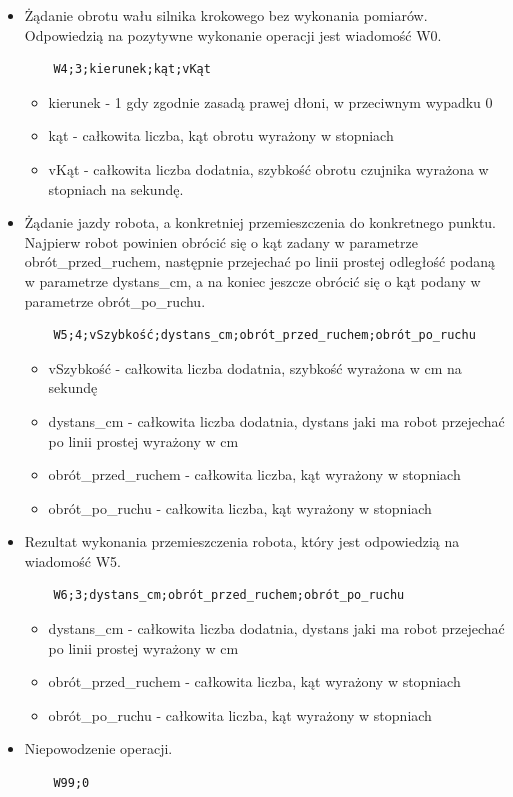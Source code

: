 \documentclass[a4paper]{article}
\begin{document}
\begin{itemize}
\begin{itemize}
	\end{itemize}
\item Żądanie obrotu wału silnika krokowego bez wykonania pomiarów. Odpowiedzią na pozytywne wykonanie operacji jest wiadomość W0.
\begin{verbatim}
	W4;3;kierunek;kąt;vKąt
\end{verbatim}
	\begin{itemize}
	\item kierunek - 1 gdy zgodnie zasadą prawej dłoni, w przeciwnym wypadku 0
	\item kąt - całkowita liczba, kąt obrotu wyrażony w stopniach
	\item vKąt - całkowita liczba dodatnia, szybkość obrotu czujnika wyrażona w stopniach na sekundę.
	\end{itemize}
\item Żądanie jazdy robota, a konkretniej przemieszczenia do konkretnego punktu. Najpierw robot powinien obrócić się o kąt zadany w parametrze obrót\_przed\_ruchem, następnie przejechać po linii prostej odległość podaną w parametrze dystans\_cm, a na koniec jeszcze obrócić się o kąt podany w parametrze obrót\_po\_ruchu. 
\begin{verbatim}
	W5;4;vSzybkość;dystans_cm;obrót_przed_ruchem;obrót_po_ruchu
\end{verbatim}
	\begin{itemize}
	\item vSzybkość - całkowita liczba dodatnia, szybkość wyrażona w cm na sekundę
	\item dystans\_cm - całkowita liczba dodatnia, dystans jaki ma robot przejechać po linii prostej wyrażony w cm
	\item obrót\_przed\_ruchem - całkowita liczba, kąt wyrażony w stopniach
	\item obrót\_po\_ruchu - całkowita liczba, kąt wyrażony w stopniach
	\end{itemize}
\item Rezultat wykonania przemieszczenia robota, który jest odpowiedzią na wiadomość W5.  
\begin{verbatim}
	W6;3;dystans_cm;obrót_przed_ruchem;obrót_po_ruchu
\end{verbatim}
	\begin{itemize}
	\item dystans\_cm - całkowita liczba dodatnia, dystans jaki ma robot przejechać po linii prostej wyrażony w cm
	\item obrót\_przed\_ruchem - całkowita liczba, kąt wyrażony w stopniach
	\item obrót\_po\_ruchu - całkowita liczba, kąt wyrażony w stopniach
	\end{itemize}
\item Niepowodzenie operacji.
\begin{verbatim}
	W99;0
\end{verbatim}
\end{itemize}
\end{document}
